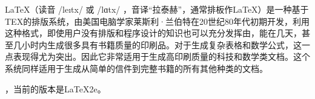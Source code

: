 
 LaTeX（读音 {\times/\textprimstress le\i t\textepsilon x/} 或 {\times/\textprimstress lɑ\textlengthmark t\textepsilon x/ }，音译“拉泰赫”，通常排板作\LaTeX）是一种基于TEX的排版系统，由美国电脑学家莱斯利·兰伯特在20世纪80年代初期开发，利用这种格式，即使用户没有排版和程序设计的知识也可以充分发挥由，能在几天，甚至几小时内生成很多具有书籍质量的印刷品。对于生成复杂表格和数学公式，这一点表现得尤为突出。因此它非常适用于生成高印刷质量的科技和数学类文档。这个系统同样适用于生成从简单的信件到完整书籍的所有其他种类的文档。

，当前的版本是\LaTeX2e。

\newcommand{\guanjianci}{\LaTeX}
